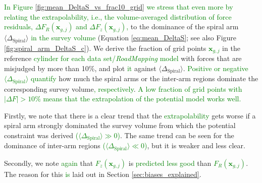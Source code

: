 \documentclass[iop,revtex4,numberedappendix,appendixfloats]{emulateapj}
\newcommand{\vect}[1]{\boldsymbol{#1}}
\newcommand{\RM}{{\sl RoadMapping}}
\newcommand{\NEW}[1]{\textcolor{Green}{#1}}
\newcommand{\OLD}[1]{}
\begin{document}
\OLD{Here,}\NEW{In Figure \ref{fig:mean_DeltaS_vs_frac10_grid} we stress that even more by relating the extrapolability, i.e., the volume-averaged distribution of force residuals,}\OLD{ we relate the volume-averaged predictive power, $\Delta F_R(g_j)$ and $\Delta F_z(g_j)$} \NEW{$\Delta F_R(\vect{x}_{g,j})$ and $\Delta F_z(\vect{x}_{g,j})$,} \OLD{(Equations \eqref{eq:delta_FR_grid}-\eqref{eq:delta_Fz_grid}; see also Figure \ref{fig:forces_bias_b})} to the dominance of the spiral arm $\langle \Delta_\text{Spiral} \rangle$ \NEW{in the survey volume} (Equation \eqref{eq:mean_DeltaS}; see also Figure \ref{fig:spiral_arm_DeltaS_c}). \OLD{We show this separately for the volumes centered on spiral arms (\texttt{S8} and \texttt{S5}; in Panel \ref{fig:mean_DeltaS_vs_frac10_grid_a}) and the analyses that used data sets drawn from inter-arm regions (\texttt{I8} and \texttt{I5}; in Panel \ref{fig:mean_DeltaS_vs_frac10_grid_b}).} We derive the fraction of grid points \OLD{$g_j$}\NEW{$\vect{x}_{g,j}$} in the reference \OLD{volume}\NEW{cylinder for each data set/\RM{} model}\OLD{(see Section \ref{sec:forces_bias})} with forces that are misjudged by more than 10\%, and plot \OLD{them}\NEW{it} against $\langle \Delta_\text{Spiral} \rangle$\OLD{in Panel \ref{fig:mean_DeltaS_vs_frac10_grid_a}, and against $-\langle \Delta_\text{Spiral} \rangle$ in Panel \ref{fig:mean_DeltaS_vs_frac10_grid_b}}. \OLD{In that way the $x$-axis quantifies}\NEW{Positive or negative $\langle \Delta_\text{Spiral}\rangle$ quantify} how much the spiral arms or the inter-arm regions dominate the corresponding survey volume\NEW{, respectively}. \NEW{A low fraction of grid points with $|\Delta F| > 10\%$ means that the extrapolation of the potential model works well.}


Firstly, we note that there is a clear trend that the \OLD{predictive power}\NEW{extrapolability} gets worse if a spiral arm strongly dominated the survey volume from which the potential constraint was derived \NEW{($\langle \Delta_\text{Spiral} \rangle \gg 0$)}. The same trend can be seen for the dominance of inter-arm regions \NEW{($\langle \Delta_\text{Spiral} \rangle \ll 0$)}, but it is weaker and less clear.

Secondly, we note \NEW{again} that \OLD{$F_z(g_j)$}\NEW{$F_z(\vect{x}_{g,j})$} is \OLD{recovered much worse}\NEW{predicted less good} than \OLD{$F_R(g_j)$}\NEW{$F_R(\vect{x}_{g,j})$}. The reason for this \OLD{was already}\NEW{is} laid out in Section \ref{sec:biases_explained}. 
\end{document}
